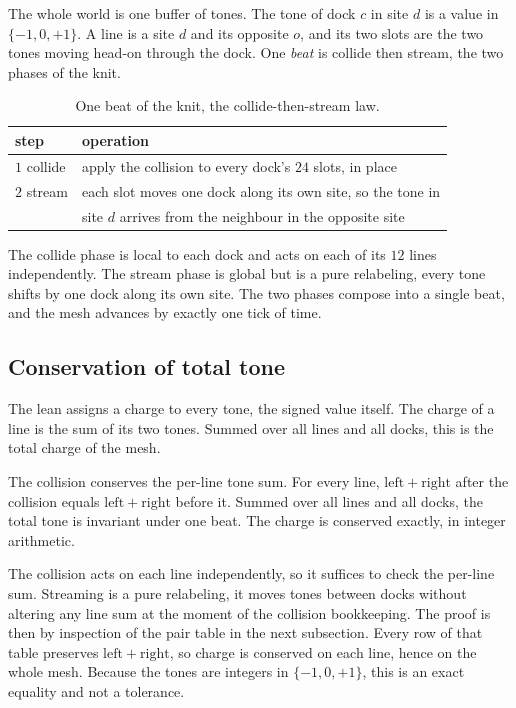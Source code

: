 The whole world is one buffer of tones. The tone of dock $c$ in site $d$ is a value in $\{-1, 0, +1\}$. A line is a site $d$ and its opposite $o$, and its two slots are the two tones moving head-on through the dock. One \emph{beat} is collide then stream, the two phases of the knit.

\begin{table}[ht]
\centering
\begin{tabular}{@{}ll@{}}
\toprule
step & operation \\
\midrule
$1$ collide & apply the collision to every dock's $24$ slots, in place \\
$2$ stream & each slot moves one dock along its own site, so the tone in \\
 & site $d$ arrives from the neighbour in the opposite site \\
\bottomrule
\end{tabular}
\caption{One beat of the knit, the collide-then-stream law.}
\label{tab:beat}
\end{table}

The collide phase is local to each dock and acts on each of its $12$ lines independently. The stream phase is global but is a pure relabeling, every tone shifts by one dock along its own site. The two phases compose into a single beat, and the mesh advances by exactly one tick of time.

\subsection{Conservation of total tone}

The lean assigns a charge to every tone, the signed value itself. The charge of a line is the sum of its two tones. Summed over all lines and all docks, this is the total charge of the mesh.

\begin{theorem}
The collision conserves the per-line tone sum. For every line, $\mathrm{left} + \mathrm{right}$ after the collision equals $\mathrm{left} + \mathrm{right}$ before it. Summed over all lines and all docks, the total tone is invariant under one beat. The charge is conserved exactly, in integer arithmetic.
\end{theorem}

The collision acts on each line independently, so it suffices to check the per-line sum. Streaming is a pure relabeling, it moves tones between docks without altering any line sum at the moment of the collision bookkeeping. The proof is then by inspection of the pair table in the next subsection. Every row of that table preserves $\mathrm{left} + \mathrm{right}$, so charge is conserved on each line, hence on the whole mesh. Because the tones are integers in $\{-1,0,+1\}$, this is an exact equality and not a tolerance.

